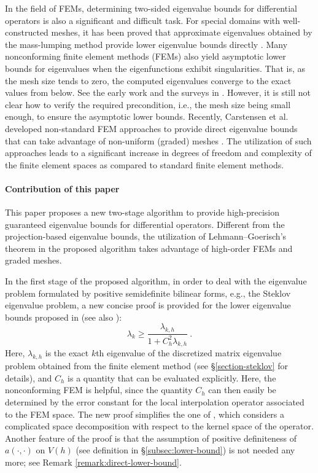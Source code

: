 \documentclass[a4,11pt]{article}
\numberwithin{equation}{section}
\begin{document}
In the field of FEMs, determining two-sided eigenvalue bounds for differential operators is also a significant and difficult task.
For special domains with well-constructed meshes, it has been proved that approximate eigenvalues obtained by the mass-lumping method provide lower eigenvalue bounds directly  \cite{Hu-Huang-Shen-2004}. Many nonconforming finite element methods (FEMs) also yield asymptotic lower bounds for eigenvalues when the eigenfunctions exhibit singularities. That is, as the mesh size tends to zero, the computed eigenvalues converge to the exact values from below. See the early work \cite{armentano2004asymptotic} and the surveys in \cite{Yang2010, Luo-Lin-Xie-2012}. 
However, it is still not clear how to verify  the required precondition, i.e., the mesh size being small enough, to ensure the asymptotic lower bounds.
Recently, Carstensen et al. developed non-standard FEM approaches to provide direct eigenvalue bounds {that can take  advantage of non-uniform (graded) meshes }\cite{carstensen2020skeletal,carstensen2021guaranteed, carstensen2023direct}. The utilization of such approaches leads to a significant increase in degrees of freedom and complexity of the finite element spaces as compared to standard finite element methods.


\medskip

\paragraph{Contribution of this paper} 	
This paper proposes a new two-stage algorithm to provide high-precision guaranteed eigenvalue bounds for differential operators. Different from the projection-based  eigenvalue bounds, the utilization of Lehmann--Goerisch's theorem in the proposed algorithm takes advantage of high-order FEMs and graded meshes.

In the first stage of the proposed algorithm, in order to deal with the eigenvalue problem formulated by positive semidefinite bilinear forms, e.g., the Steklov eigenvalue problem, a new concise proof is provided for the lower eigenvalue bounds proposed in \cite{You-Xie-Liu-2019} (see also \cite{Kikuchi+Liu2007,Kobayashi2015,Carstensen2014,Liu-Oishi-2013}):
%
\begin{equation}
\label{main-result-summary}
\lambda_k \ge  \frac{\lambda_{k,h}}{1+C_h^2 \lambda_{k,h}}\:.
\end{equation}
Here, $\lambda_{k,h}$ is the exact $k$th eigenvalue of {the} discretized matrix eigenvalue problem obtained from the finite element method (see \S\ref{section-steklov} for details), and 
$C_h$ is a quantity that can be evaluated {explicitly}.
{Here, the nonconforming FEM is helpful, since the quantity $C_h$ can then easily be determined by the error constant for the local interpolation operator associated to the FEM space.}
The new proof simplifies the one of \cite{You-Xie-Liu-2019}, which considers a complicated space decomposition with respect to the kernel space of the operator. Another feature of the proof is that the assumption of positive definiteness of $a(\cdot, \cdot)$ on $V(h)$ (see definition in \S\ref{subsec:lower-bound}) is not needed any more; see Remark \ref{remark:direct-lower-bound}.
\end{document}
